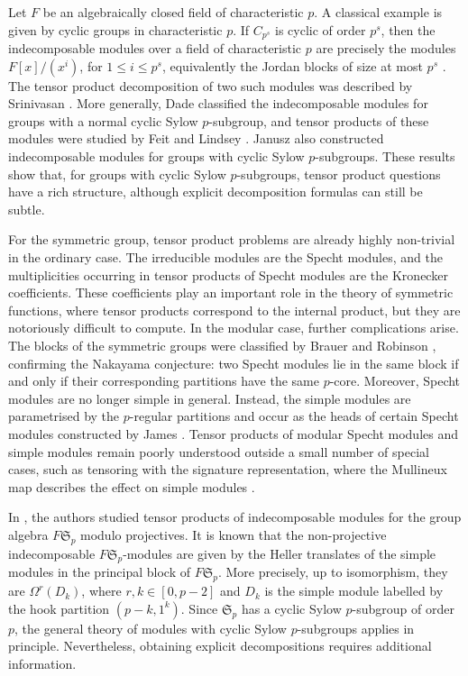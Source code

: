 \documentclass[12pt,reqno]{amsart}
\newcommand{\sym}[1]{\mathfrak{S}_{#1}}
\newcommand{\F}{{F}}
\renewcommand{\leq}{\leqslant}
\theoremstyle{definition}
\numberwithin{equation}{section}
\begin{document}
Let $F$ be an algebraically closed field of characteristic $p$. A classical example is given by cyclic groups in characteristic $p$. If $C_{p^s}$ is cyclic of order $p^s$, then the indecomposable modules over a field of characteristic $p$ are precisely the modules $F[x]/(x^i)$, for $1 \leq i \leq p^s$, equivalently the Jordan blocks of size at most $p^s$ \cite{Higman:1954}. The tensor product decomposition of two such modules was described by Srinivasan \cite{Srinivasan:1964}. More generally, Dade \cite{Dade:1966} classified the indecomposable modules for groups with a normal cyclic Sylow $p$-subgroup, and tensor products of these modules were studied by Feit \cite{Feit:1966} and Lindsey \cite{Lindsey:1974}. Janusz \cite{Janusz:1966} also constructed indecomposable modules for groups with cyclic Sylow $p$-subgroups. These results show that, for groups with cyclic Sylow $p$-subgroups, tensor product questions have a rich structure, although explicit decomposition formulas can still be subtle.

For the symmetric group, tensor product problems are already highly non-trivial in the ordinary case. The irreducible modules are the Specht modules, and the multiplicities occurring in tensor products of Specht modules are the Kronecker coefficients. These coefficients play an important role in the theory of symmetric functions, where tensor products correspond to the internal product, but they are notoriously difficult to compute. In the modular case, further complications arise. The blocks of the symmetric groups were classified by Brauer and Robinson \cite{Brauer:1947,robinsonproof}, confirming the Nakayama conjecture: two Specht modules lie in the same block if and only if their corresponding partitions have the same $p$-core. Moreover, Specht modules are no longer simple in general. Instead, the simple modules are parametrised by the $p$-regular partitions and occur as the heads of certain Specht modules constructed by James \cite{james}. Tensor products of modular Specht modules and simple modules remain poorly understood outside a small number of special cases, such as tensoring with the signature representation, where the Mullineux map describes the effect on simple modules \cite{Ford/Kleshchev:1997,Mullineux:1979}.

In \cite{kualim1}, the authors studied tensor products of indecomposable modules for the group algebra $\F\sym{p}$ modulo projectives. It is known that the non-projective indecomposable $\F\sym{p}$-modules are given by the Heller translates of the simple modules in the principal block of $\F\sym{p}$. More precisely, up to isomorphism, they are $\Omega^r(D_k)$, where $r,k\in [0,p-2]$ and $D_k$ is the simple module labelled by the hook partition $(p-k,1^k)$. Since $\sym{p}$ has a cyclic Sylow $p$-subgroup of order $p$, the general theory of modules with cyclic Sylow $p$-subgroups applies in principle. Nevertheless, obtaining explicit decompositions requires additional information. %
\end{document}
